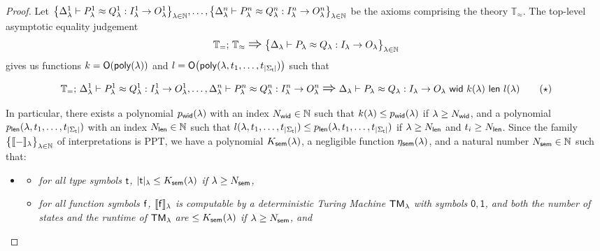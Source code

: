 \begin{proof}
Let $\big\{\Delta^1_\lambda \vdash P^1_\lambda \approx Q^1_\lambda : I^1_\lambda \to O^1_\lambda\big\}_{\lambda \in \mathbb{N}}, \ldots, \big\{\Delta^n_\lambda \vdash P^n_\lambda \approx Q^n_\lambda : I^n_\lambda \to O^n_\lambda\big\}_{\lambda \in \mathbb{N}}$ be the axioms comprising the theory $\mathbb{T}_\approx$. The top-level asymptotic equality judgement
\[ \mathbb{T}_=; \, \mathbb{T}_\approx \; \mathlarger{\mathlarger{\Rightarrow}} \; \big\{\Delta_\lambda \vdash P_\lambda \approx Q_\lambda : I_\lambda \to O_\lambda\big\}_{\lambda \in \nat}
\]
gives us functions $k = \mathsf{O}(\mathsf{poly}(\lambda))$ and $l = \mathsf{O}\big(\mathsf{poly}(\lambda,t_1,\ldots,t_{|\Sigma_{\mathsf{t}}|})\big)$ such that

\[\mathbb{T}_=; \, \Delta^1_\lambda \vdash P^1_\lambda \approx Q^1_\lambda : I^1_\lambda \to O^1_\lambda, \ldots, \Delta^n_\lambda \vdash P^n_\lambda \approx Q^n_\lambda : I^n_\lambda \to O^n_\lambda \; \mathlarger{\mathlarger{\Rightarrow}} \; \Delta_\lambda \vdash \approxeq{P_\lambda}{Q_\lambda}{I_\lambda}{O_\lambda}{k(\lambda)}{l(\lambda)} \tag{$\star$}\]%

\noindent In particular, there exists a polynomial $p_{\mathsf{wid}}(\lambda)$ with an index $N_{\mathsf{wid}} \in \mathbb{N}$ such that $k(\lambda) \leq p_{\mathsf{wid}}(\lambda)$ if $\lambda \geq N_{\mathsf{wid}}$, and a polynomial $p_{\mathsf{len}}(\lambda,t_1,\ldots,t_{|\Sigma_{\mathsf{t}}|})$ with an index $N_{\mathsf{len}} \in \mathbb{N}$ such that $l(\lambda,t_1,\ldots,t_{|\Sigma_{\mathsf{t}}|}) \leq p_{\mathsf{len}}(\lambda,t_1,\ldots,t_{|\Sigma_{\mathsf{t}}|})$ if $\lambda \geq N_{\mathsf{len}}$ and $t_i \geq N_{\mathsf{len}}$. Since the family $\big\{\llbracket - \rrbracket_\lambda\big\}_{\lambda \in \mathbb{N}}$ of interpretations is PPT, we have a polynomial $K_{\mathsf{sem}}(\lambda)$, a negligible function $\eta_{\mathsf{sem}}(\lambda)$, and a natural number $N_{\mathsf{sem}} \in \mathbb{N}$ such that:

\begin{itemize}
\item[]
\begin{itemize}
\item \emph{for all type symbols $\mathsf{t}$, $|\mathsf{t}|_\lambda \leq K_{\mathsf{sem}}(\lambda)$ if $\lambda \geq N_{\mathsf{sem}}$,}

\item \emph{for all function symbols $\mathsf{f}$, $\llbracket \mathsf{f} \rrbracket_\lambda$ is computable by a deterministic Turing Machine $\mathsf{TM}_\lambda$ with symbols $\mathsf{0}, \mathsf{1}$, and both the number of states and the runtime of $\mathsf{TM}_\lambda$ are $\leq K_{\mathsf{sem}}(\lambda)$ if $\lambda \geq N_{\mathsf{sem}}$, and}


\end{itemize}
\end{itemize}
\end{proof}
